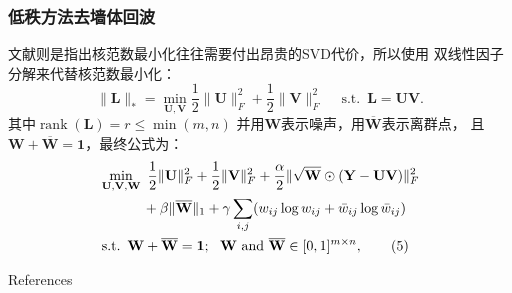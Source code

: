 \documentclass[12pt]{beamer}
\begin{document}
\begin{frame}
  \frametitle{低秩方法去墙体回波}
  文献\citep{Guo2018Low}则是指出核范数最小化往往需要付出昂贵的SVD代价，所以使用
  双线性因子分解来代替核范数最小化：
\begin{equation*} \| \mathbf {L}\|_{*} = \min _{ \mathbf {U}, \mathbf {V}}\frac {1}{2}\| \mathbf {U}\|_{F}^{2}+\frac {1}{2}\| \mathbf {V}\|_{F}^{2}\quad \mathop{\mathrm{s.t.}}\limits ~ \mathbf {L}= \mathbf {U} \mathbf {V}.\end{equation*}
其中$\mathop{\mathrm{rank}}\limits (\mathbf {L})=r\leq \min (m,n)$
并用$\mathbf{W}$表示噪声，用$\mathbf{\overline{W}}$表示离群点，
且$\mathbf {W}+\overline{\mathbf{W}}= \mathbf{1}$，最终公式为：
\begin{align*}&\min _{ \mathbf {U}, \mathbf {V}, \mathbf {W}}~\frac {1}{2}\| \mathbf {U}\|_{F}^{2}+\frac {1}{2}\| \mathbf {V}\|_{F}^{2}+\frac {\alpha }{2}\|\sqrt { \mathbf {W}}\odot (\mathbf {Y}- \mathbf {UV})\|_{F}^{2} \\&\hphantom {\min _{ \mathbf {U}, \mathbf {V}, \mathbf {W}}~}+\beta \|\overline { \mathbf {W}}\|_{1}+\gamma \sum _{i,j}(w_{ij}\log w_{ij}+\bar {w}_{ij}\log \bar {w}_{ij}) \\&\mathop{\mathrm{s.t.}}\limits ~ \mathbf {W}+\overline { \mathbf {W}}= \mathbf {1}; ~~ \mathbf {W} ~\text {and} ~\overline { \mathbf {W}}\in [{0,1}]^{m\times n},\tag{5}\end{align*}
\end{frame}
\begin{frame}{References}
  \scriptsize
   
   
\end{frame}
\end{document}
